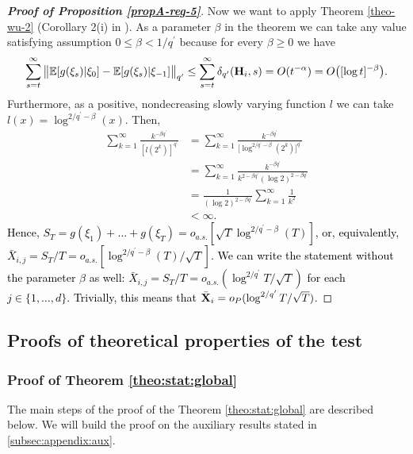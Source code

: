 \documentclass[a4paper,12pt]{article}
\begin{document}
\begin{proof}[\textnormal{\textbf{Proof of Proposition \ref{propA-reg-5}}}]
Now we want to apply Theorem \ref{theo-wu-2} (Corollary 2(i) in \cite{Wu2007}). As a parameter $\beta$ in the theorem we can take any value satisfying assumption $0 \leq \beta < 1/{q^\prime}$ because for every $\beta \geq 0$ we have 
\begin{align*}
\sum_{s = t}^\infty \big\lVert \mathbb{E} [g(\xi_s)| \xi_0] - \mathbb{E} [g(\xi_s)| \xi_{-1}]\big\lVert_{q^\prime} \leq \sum_{s = t}^\infty \delta_{q^\prime}(\mathbf{H}_i, s) =O(t^{-\alpha}) = O\big([\log t]^{-\beta}\big).
\end{align*}
Furthermore, as a positive, nondecreasing slowly varying function $\mathit{l}$ we can take \linebreak $\mathit{l}(x) = \log^{2/{q^\prime} - \beta}(x)$. Then,
\begin{align*}
\sum_{k=1}^\infty \frac{k^{-\beta q^\prime}}{[l(2^k)]^{q^\prime}} &= \sum_{k=1}^\infty \frac{k^{-\beta  q^\prime}}{\big[\log^{2/{q^\prime} - \beta}(2^k)\big]^{q^\prime}} \\
&= \sum_{k=1}^\infty \frac{k^{-\beta  q^\prime}}{k^{2 -\beta q^\prime }(\log 2)^{2 - \beta q^\prime}} \\
&= \frac{1}{(\log 2)^{2 - \beta q^\prime}}\sum_{k=1}^\infty \frac{1}{k^2} \\
&< \infty.
\end{align*}
\textcolor{black}{Hence, $S_T = g(\xi_1) + \ldots + g(\xi_T) = o_{a.s.}[\sqrt{T}\log^{2/{q^\prime} - \beta}(T)]$, or, equivalently, \linebreak $\bar{X}_{i, j} = S_T/T = o_{a.s.}[\log^{2/{q^\prime} - \beta}(T)/\sqrt{T}]$. We can write the statement without the parameter $\beta$ as well: $\bar{X}_{i, j} = S_T/T = o_{a.s.}(\log^{2/{q^\prime}}{T}/\sqrt{T})$ for each $j \in \{1, \ldots, d\}$. Trivially, this means that $\bar{\mathbf{X}}_i = o_P(\log^{2/{q^\prime}}{T}/\sqrt{T})$.}
\end{proof}


\subsection{Proofs of theoretical properties of the test}
\subsubsection*{Proof of Theorem \ref{theo:stat:global}}\label{subsec-appendix-stat-equality}

The main steps of the proof of the Theorem \ref{theo:stat:global} are described below. We will build the proof on the auxiliary results stated in \ref{subsec:appendix:aux}.
 
\end{document}
